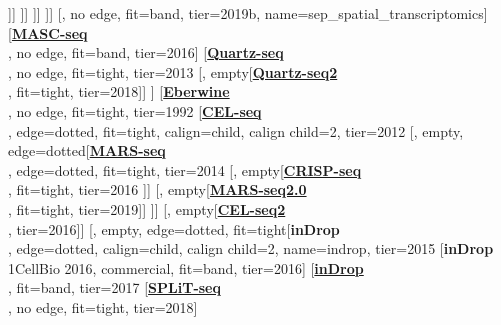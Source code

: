 \documentclass[12pt, a4]{article}
\begin{document}
\begin{center}
\begin{forest}
					[\href{https://science.sciencemag.org/content/363/6434/1463}{\textbf{Slide-seq\textsuperscript{\large{\textmu}}}}\\\citealt{rodriques2019}, no edge, fit=band, tier=2019]
				]]
			]]
		]]
	]]
	[, no edge, fit=band, tier=2019b, name=sep_spatial_transcriptomics]
	[\href{https://www.nature.com/articles/ncomms13182}{\textbf{MASC-seq}}\\\citealt{vickovic2016}, no edge, fit=band, tier=2016]
	[\href{https://genomebiology.biomedcentral.com/articles/10.1186/gb-2013-14-4-r31}{\textbf{Quartz-seq}}\\\citealt{sasagawa2013}, no edge, fit=tight, tier=2013
		[, empty[\href{https://genomebiology.biomedcentral.com/articles/10.1186/s13059-018-1407-3}{\textbf{Quartz-seq2}}\\\citealt{sasagawa2018}, fit=tight, tier=2018]]
	]
	[\href{https://www.pnas.org/content/89/7/3010}{\textbf{Eberwine}}\\\citealt{eberwine1992}, no edge, fit=tight, tier=1992
	[\href{https://www.cell.com/cell-reports/fulltext/S2211-1247(12)00228-8}{\textbf{CEL-seq}}\\\citealt{hashimshony2012}, edge=dotted, fit=tight, calign=child, calign child=2, tier=2012
		[, empty, edge=dotted[\href{https://science.sciencemag.org/content/343/6172/776}{\textbf{MARS-seq}}\\\citealt{jaitin2014}, edge=dotted, fit=tight, tier=2014
			[, empty[\href{https://linkinghub.elsevier.com/retrieve/pii/S0092-8674(16)31611-7}{\textbf{CRISP-seq}}\\\citealt{jaitin2016}, fit=tight, tier=2016
			]]
			[, empty[\href{https://www.nature.com/articles/s41596-019-0164-4}{\textbf{MARS-seq2.0}}\\\citealt{keren-shaul2019}, fit=tight, tier=2019]]
		]]
		[, empty[\href{https://genomebiology.biomedcentral.com/articles/10.1186/s13059-016-0938-8}{\textbf{CEL-seq2}}\\\citealt{hashimshony2016}, tier=2016]]
		[, empty, edge=dotted, fit=tight[\textbf{inDrop}\\\citealt{klein2015}, edge=dotted, calign=child, calign child=2, name=indrop, tier=2015
			[\textbf{inDrop}\\1CellBio 2016, commercial, fit=band,  tier=2016]
			[\href{https://www.nature.com/articles/nprot.2016.154}{\textbf{inDrop}}\\\citealt{zilionis2017}, fit=band, tier=2017
				[\href{https://science.sciencemag.org/content/360/6385/176}{\textbf{SPLiT-seq}}\\\citealt{rosenberg2018}, no edge, fit=tight, tier=2018]

\end{forest}
\end{center}
\end{document}
